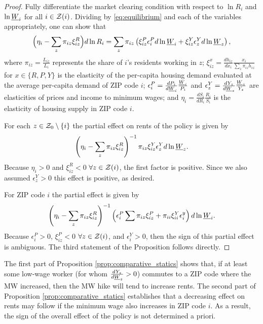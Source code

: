\begin{proof}
    Fully differentiate the market clearing condition with respect to $\ln R_i$ 
    and $\ln \underline{W}_i$ for all $i\in\mathcal{Z}(i)$.
    Dividing by \eqref{eq:equilibrium} and each of the variables appropriately, 
    one can show that
    \begin{equation}\label{eq:diff_equilibrium}
        \Big(\eta_i - \sum_z \pi_{iz} \xi^R_{iz} \Big) d \ln R_i
        = 
        \sum_z \pi_{iz} \left(\xi^P_{iz} \epsilon_{i}^P d \ln \underline{W}_i 
                            + \xi^Y_{iz} \epsilon_{z}^Y d \ln \underline{W}_z \right) ,
    \end{equation}
    where
    $\pi_{iz} = \frac{L_{iz}}{L_i}$ represents the share of $i$'s residents 
    working in $z$;
    $\xi_{iz}^x = \frac{d h_{iz}}{d x_i} \frac{x_i}{\sum_z \pi_{iz} h_{iz}}$ for
    $x\in\{R,P,Y\}$ is the elasticity of the per-capita housing demand evaluated 
    at the average per-capita demand of ZIP code $i$;
    $\epsilon_{i}^P = \frac{d P_i}{d \underline{W}_i} \frac{\underline{W}_i}{P_i}$ and 
    $\epsilon_{z}^Y = \frac{d Y_z}{d \underline{W}_z} \frac{\underline{W}_z}{Y_z}$ are
    elasticities of prices and income to minimum wages; and
    $\eta_i = \frac{d S_i}{d R_i} \frac{R_i}{S_i}$ is the elasticity 
    of housing supply in ZIP code $i$.

    For each $z\in\mathcal{Z}_0\setminus\{i\}$ the partial effect on rents of the policy
    is given by 
    $$\left(\eta_i - \sum_z \pi_{iz} \xi^R_{iz}\right)^{-1} 
      \pi_{iz}\xi^Y_{iz}\epsilon_{z}^Y d\ln\underline{W}_z.$$
    Because $\eta_i>0$ and $\xi^R_{iz} < 0$  $\forall z\in\mathcal{Z}(i)$, 
    the first factor is positive.
    Since we also assumed $\epsilon_{z}^Y>0$ this effect is positive, as 
    desired.

    For ZIP code $i$ the partial effect is given by
    $$\left(\eta_i - \sum_z \pi_{iz} \xi^R_{iz}\right)^{-1} 
      \left(\epsilon_{i}^P \sum \pi_{iz}\xi^P_{iz} 
            + \pi_{ii}\xi^Y_{ii}\epsilon_i^y \right)d\ln\underline{W}_i.$$
    Because $\epsilon_{i}^P>0$, $\xi^P_{iz}<0$ $\forall z\in\mathcal{Z}(i)$,
    and $\epsilon_{i}^Y>0$, 
    then the sign of this partial effect is ambiguous.
    The third statement of the Proposition follows directly.
\end{proof}

The first part of Proposition \ref{prop:comparative_statics} shows that,
if at least some low-wage worker (for whom $\frac{d Y_z}{d \underline{W}_z}>0$)
commutes to a ZIP code where the MW increased,
then the MW hike will tend to increase rents.
The second part of Proposition \ref{prop:comparative_statics} establishes that 
a decreasing effect on rents may follow if the minimum wage also increases in 
ZIP code $i$.
As a result, the sign of the overall effect of the policy is not determined a 
priori.

